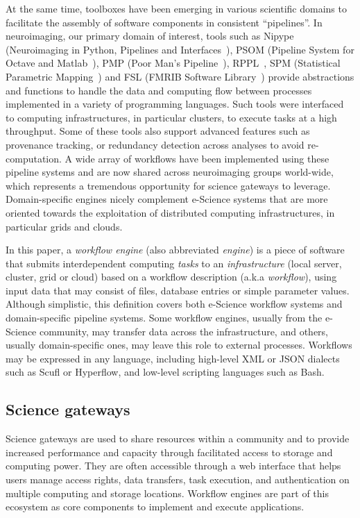 \documentclass[preprint,3p,twocolumn]{elsarticle}
\begin{document}
At the same time, toolboxes have been emerging in various scientific
domains to facilitate the assembly of software components in
consistent ``pipelines''. In neuroimaging, our primary domain of
interest, tools such as Nipype (Neuroimaging in Python, Pipelines and
Interfaces~\cite{gorgolewski2011nipype}), PSOM (Pipeline System for
Octave and Matlab~\cite{bellec2012pipeline}), 
PMP (Poor Man's Pipeline~\cite{Ad-DabbaghY2006}), RPPL~\cite{1174106}, SPM (Statistical
Parametric Mapping~\cite{ashburner2011spm}) and FSL (FMRIB Software
Library~\cite{Jenkinson2012782}) provide abstractions and functions to
handle the data and computing flow between processes implemented in a
variety of programming languages. Such tools were interfaced to
computing infrastructures, in particular
clusters, to execute tasks at a high throughput. Some of
these tools also support advanced features such as provenance
tracking, or  redundancy detection across
analyses to avoid re-computation. A wide array of workflows
have been implemented using these pipeline systems and are now shared across
neuroimaging groups world-wide, which represents a tremendous
opportunity for science gateways to leverage. Domain-specific engines
nicely complement e-Science systems that are more oriented towards the
exploitation of distributed computing infrastructures, in particular
grids and clouds.

In this paper, a
\emph{workflow engine} (also abbreviated \emph{engine}) is a piece of
software that submits interdependent computing \emph{tasks} to an
\emph{infrastructure} (local server, cluster, grid or cloud) based on
a workflow description (a.k.a \emph{workflow}), using input data
that may consist of files, database entries or simple parameter
values. Although simplistic, this definition covers both e-Science workflow systems and
domain-specific pipeline systems.
Some workflow engines, 
usually from the e-Science community, 
may transfer data across the infrastructure, and others, usually
domain-specific ones, may leave this role to external processes. Workflows
may be expressed in any language, including high-level XML or JSON
dialects such as Scufl or Hyperflow, and low-level scripting languages
such as Bash.

\subsection{Science gateways}

\label{sec:intro_sg}

Science gateways are used to share resources within a community and to
provide increased performance and capacity through facilitated access
to storage and computing power. They are often accessible through a
web interface that helps users manage access rights, data transfers,
task execution, and authentication on multiple computing and storage
locations. Workflow engines are part of this ecosystem as core
components to implement and execute
applications. 
\end{document}
